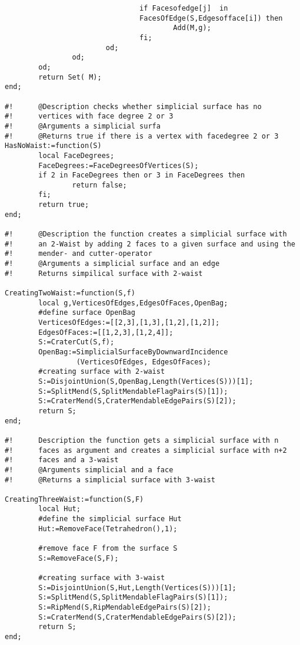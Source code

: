 \documentclass[12pt,titlepage,twoside,cleardoublepage]{article}
\theoremstyle{nummermitklammern}
\numberwithin{equation}{section}
\begin{document}
\begin{linenumbers}
\begin{verbatim}
                                if Facesofedge[j]  in
                                FacesOfEdge(S,Edgesofface[i]) then
                                        Add(M,g);
                                fi;
                        od;
                od;
        od;
        return Set( M);
end;

#!      @Description checks whether simplicial surface has no 
#!      vertices with face degree 2 or 3
#!      @Arguments a simplicial surfa
#!      @Returns true if there is a vertex with facedegree 2 or 3
HasNoWaist:=function(S)
        local FaceDegrees;
        FaceDegrees:=FaceDegreesOfVertices(S);
        if 2 in FaceDegrees then or 3 in FaceDegrees then
                return false;
        fi;
        return true;
end;

#!      @Description the function creates a simplicial surface with 
#!      an 2-Waist by adding 2 faces to a given surface and using the 
#!      mender- and cutter-operator
#!      @Arguments a simplicial surface and an edge
#!      Returns simpilical surface with 2-waist

CreatingTwoWaist:=function(S,f)
        local g,VerticesOfEdges,EdgesOfFaces,OpenBag;
        #define surface OpenBag
        VerticesOfEdges:=[[2,3],[1,3],[1,2],[1,2]];
        EdgesOfFaces:=[[1,2,3],[1,2,4]];
        S:=CraterCut(S,f);
        OpenBag:=SimplicialSurfaceByDownwardIncidence
                 (VerticesOfEdges, EdgesOfFaces);                                          
        #creating surface with 2-waist
        S:=DisjointUnion(S,OpenBag,Length(Vertices(S)))[1];
        S:=SplitMend(S,SplitMendableFlagPairs(S)[1]);
        S:=CraterMend(S,CraterMendableEdgePairs(S)[2]);
        return S;
end;

#!      Description the function gets a simplicial surface with n 
#!      faces as argument and creates a simplicial surface with n+2 
#!      faces and a 3-waist
#!      @Arguments simplicial and a face
#!      @Returns a simplicial surface with 3-waist

CreatingThreeWaist:=function(S,F)
        local Hut;
        #define the simplicial surface Hut
        Hut:=RemoveFace(Tetrahedron(),1);

        #remove face F from the surface S
        S:=RemoveFace(S,F);

        #creating surface with 3-waist
        S:=DisjointUnion(S,Hut,Length(Vertices(S)))[1];
        S:=SplitMend(S,SplitMendableFlagPairs(S)[1]);
        S:=RipMend(S,RipMendableEdgePairs(S)[2]);
        S:=CraterMend(S,CraterMendableEdgePairs(S)[2]);
        return S;
end;




\end{verbatim}
\end{linenumbers}
\end{document}
